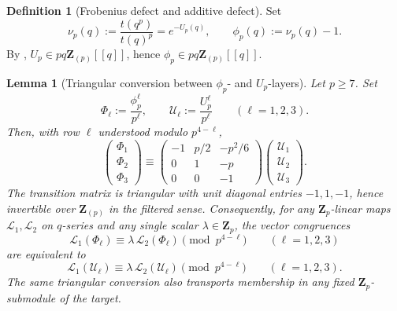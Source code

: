 \documentclass[11pt]{amsart}
\newtheorem{lemma}[theorem]{Lemma}
\theoremstyle{definition}
\newtheorem{definition}[theorem]{Definition}
\theoremstyle{remark}
\newcommand{\Z}{\mathbf{Z}}
\begin{document}
\begin{definition}[Frobenius defect and additive defect]\label{def:nu-phi}
Set
\[
\nu_p(q):=\frac{t(q^p)}{t(q)^p}=e^{-U_p(q)},\qquad
\phi_p(q):=\nu_p(q)-1.
\]
By , $U_p\in pq\Z_{(p)}[[q]]$, hence $\phi_p\in pq\Z_{(p)}[[q]]$.
\end{definition}

\begin{lemma}[Triangular conversion between $\phi_p$- and $U_p$-layers]\label{lem:phi-U-triangular}
Let $p\ge 7$. Set
\[
\Phi_\ell:=\frac{\phi_p^\ell}{p^\ell},\qquad
\mathcal U_\ell:=\frac{U_p^\ell}{p^\ell}\qquad(\ell=1,2,3).
\]
Then, with row $\ell$ understood modulo $p^{4-\ell}$,
\[
\begin{pmatrix}\Phi_1\\ \Phi_2\\ \Phi_3\end{pmatrix}
\equiv
\begin{pmatrix}-1 & p/2 & -p^2/6\\ 0 & 1 & -p\\ 0 & 0 & -1\end{pmatrix}
\begin{pmatrix}\mathcal U_1\\ \mathcal U_2\\ \mathcal U_3\end{pmatrix}.
\]
The transition matrix is triangular with unit diagonal entries $-1,1,-1$, hence invertible over $\Z_{(p)}$ in the filtered sense. Consequently, for any $\Z_p$-linear maps $\mathcal L_1,\mathcal L_2$ on $q$-series and any single scalar $\lambda\in\Z_p$, the vector congruences
\[
\mathcal L_1(\Phi_\ell)\equiv\lambda\,\mathcal L_2(\Phi_\ell)\pmod{p^{4-\ell}}\qquad(\ell=1,2,3)
\]
are equivalent to
\[
\mathcal L_1(\mathcal U_\ell)\equiv\lambda\,\mathcal L_2(\mathcal U_\ell)\pmod{p^{4-\ell}}\qquad(\ell=1,2,3).
\]
The same triangular conversion also transports membership in any fixed $\Z_p$-submodule of the target.
\end{lemma}
\end{document}
